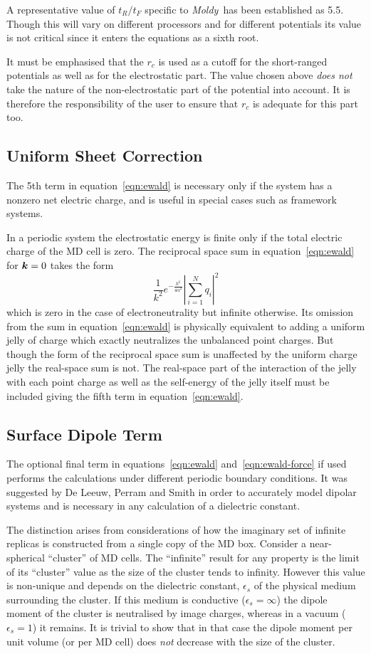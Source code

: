 \documentclass[twoside]{report}
\newcommand{\moldy}{{\em Moldy}}
\newcommand{\bm}[1]{\mbox{\boldmath \protect\(#1\protect\)}}
\begin{document}
A representative value of $t_R/t_F$ specific to \moldy\ has been
established as 5.5.  Though this will vary on different processors
and for different potentials its value is not critical since it
enters the equations as a sixth root.  

It must be emphasised that the $r_c$ is used as a cutoff for the
short-ranged potentials as well as for the electrostatic part.  The
value chosen above {\em does not}\/ take the nature of the
non-electrostatic part of the potential into account.  It is therefore
the responsibility of the user to ensure that $r_c$ is adequate for
this part too.

\subsection{Uniform Sheet Correction}
The 5th term in equation~\ref{eqn:ewald} is necessary only if the system
has a nonzero net electric charge, and is useful in special cases such
as framework systems.  

In a periodic system the electrostatic energy is finite only if the
total electric charge of the MD cell is zero.  The reciprocal space
sum in equation~\ref{eqn:ewald} for $\bm{k}=0$ takes the form
\[\frac{1}{k^2}e^{-\frac{k^2}{4 \alpha^2}} \left | \sum_{i=1}^{N} q_i
 \right |^2\] which is zero in the case of electroneutrality but
infinite otherwise.  Its omission from the sum in
equation~\ref{eqn:ewald} is physically equivalent to adding a uniform
jelly of charge which exactly neutralizes the unbalanced point
charges.  But though the form of the reciprocal space sum is
unaffected by the uniform charge jelly the real-space sum is not.  The
real-space part of the interaction of the jelly with each point charge
as well as the self-energy of the jelly itself must be included giving
the fifth term in equation~\ref{eqn:ewald}.

\subsection{Surface Dipole Term}
The optional final term in equations~\ref{eqn:ewald} 
and~\ref{eqn:ewald-force} if used performs the calculations under
different periodic boundary conditions.  It was suggested by De Leeuw,
Perram and Smith\cite{deleeuw:80} in order to accurately model
dipolar systems and is necessary in any calculation of a dielectric
constant. 

The distinction arises from considerations of how the imaginary set of
infinite replicas is constructed from a single copy of the MD 
box\cite[pp 156-159]{allen:87}.  Consider a near-spherical ``cluster''
of MD cells.  The ``infinite'' result for any property is the limit of
its ``cluster'' value as the size of the cluster tends to infinity.
However this value is non-unique and depends on the dielectric
constant, $\epsilon_s$ of the physical medium surrounding the cluster.
If this medium is conductive ($\epsilon_s=\infty$) the dipole
moment of the cluster is neutralised by image charges, whereas in a
vacuum ($\epsilon_s=1$) it remains.  It is trivial to show that
in that case the dipole moment per unit volume (or per MD cell) does
{\em not\/} decrease with the size of the cluster.
\end{document}
